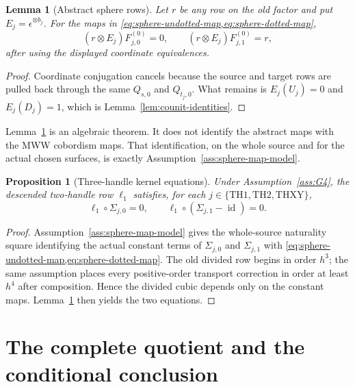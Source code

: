 \documentclass[10pt,reqno]{amsart}
\newtheorem{proposition}[theorem]{Proposition}
\newtheorem{lemma}[theorem]{Lemma}
\theoremstyle{definition}
\theoremstyle{remark}
\newcommand{\id}{\operatorname{id}}
\begin{document}
\begin{lemma}[Abstract sphere rows]\label{lem:abstract-sphere-rows}
Let $r$ be any row on the old factor and put
$E_j=\epsilon^{\otimes b_j}$.  For the maps in
\cref{eq:sphere-undotted-map,eq:sphere-dotted-map},
\begin{equation}\label{eq:abstract-sphere-rows}
(r\otimes E_j)F_{j,0}^{(0)}=0,
\qquad
(r\otimes E_j)F_{j,1}^{(0)}=r,
\end{equation}
after using the displayed coordinate equivalences.
\end{lemma}

\begin{proof}
Coordinate conjugation cancels because the source and target rows are pulled
back through the same $Q_{s,0}$ and $Q_{t_j,0}$.  What remains is
$E_j(U_j)=0$ and $E_j(D_j)=1$, which is
Lemma~\ref{lem:counit-identities}.
\end{proof}

Lemma~\ref{lem:abstract-sphere-rows} is an algebraic theorem.  It does not
identify the abstract maps with the MWW cobordism maps.  That identification,
on the whole source and for the actual chosen surfaces, is exactly
Assumption~\ref{ass:sphere-map-model}.

\begin{proposition}[Three-handle kernel equations]\label{prop:sphere-kernel}
Under Assumption~\ref{ass:G4}, the descended two-handle row $\ell_1$ satisfies,
for each $j\in\{\mathrm{TH1},\mathrm{TH2},\mathrm{THXY}\}$,
\begin{equation}\label{eq:sphere-kernel}
\ell_1\circ\Sigma_{j,0}=0,
\qquad
\ell_1\circ(\Sigma_{j,1}-\id)=0.
\end{equation}
\end{proposition}

\begin{proof}
Assumption~\ref{ass:sphere-map-model} gives the whole-source naturality
square identifying the actual constant terms of $\Sigma_{j,0}$ and
$\Sigma_{j,1}$ with \cref{eq:sphere-undotted-map,eq:sphere-dotted-map}.
The old divided row begins in order $h^3$; the same assumption places every
positive-order transport correction in order at least $h^4$ after
composition.  Hence the divided cubic depends only on the constant maps.
Lemma~\ref{lem:abstract-sphere-rows} then yields the two equations.
\end{proof}

\section{The complete quotient and the conditional conclusion}\label{sec:final-descent}
\end{document}
